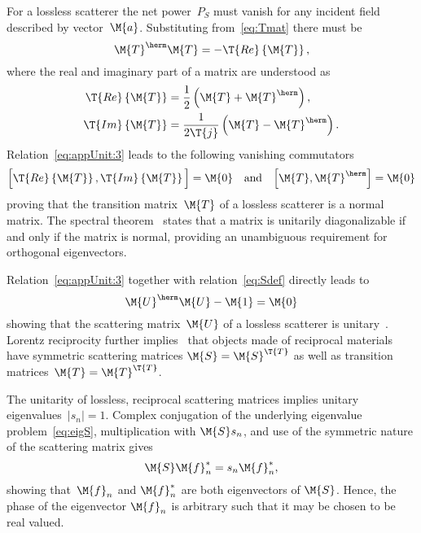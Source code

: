 \documentclass[journal]{IEEEtran}
\providecommand{\Smat}{\M{U}} %
\begin{document}
For a lossless scatterer the net power~$P_S$ must vanish for any incident field described by vector~$\M{a}$. Substituting from~\eqref{eq:Tmat} 
there must be
\begin{equation}
    \label{eq:appUnit:3}
    \M{T}^\herm \M{T} = - \T{Re} \left\{ \M{T} \right\},
\end{equation}
where the real and imaginary part of a matrix are understood as
\begin{equation}
\begin{aligned}
    \T{Re} \left\{ \M{T} \right\} &= \dfrac{1}{2} \left( \M{T} + \M{T}^\herm \right), \\
    \T{Im} \left\{ \M{T} \right\} &= \dfrac{1}{2 \T{j}} \left( \M{T} - \M{T}^\herm \right).
\end{aligned}
\end{equation}
Relation~\eqref{eq:appUnit:3} leads to the following vanishing commutators
\begin{equation}
\Big[\T{Re} \left\{ \M{T} \right\}, \T{Im} \left\{ \M{T} \right\} \Big] = \M{0} \quad \text{and} \quad \Big[ \M{T} , \M{T}^\herm \Big] = \M{0}
\end{equation}
proving that the transition matrix~$\M{T}$ of a lossless scatterer is a normal matrix.  The spectral theorem~\cite[Chap.~2.5]{HornJohnson_MatrixAnalysis} states that a matrix is unitarily diagonalizable if and only if the matrix is normal, providing an unambiguous requirement for orthogonal eigenvectors.

Relation~\eqref{eq:appUnit:3} together with relation~\eqref{eq:Sdef} directly leads to
\begin{equation}
\Smat^\herm \Smat - \M{1} = \M{0}
\end{equation}
showing that the scattering matrix~$\Smat$ of a lossless scatterer is unitary~\cite[Chap.~4]{Collin_FoundationsForMicrowaveEngineering}. Lorentz reciprocity further implies~\cite[Chap.~4]{Collin_FoundationsForMicrowaveEngineering} that objects made of reciprocal materials have symmetric scattering matrices $\M{S}=\M{S}^{\T{T}}$ as well as transition matrices~$\M{T}=\M{T}^{\T{T}}$.

The unitarity of lossless, reciprocal scattering matrices implies unitary eigenvalues~$|s_n|=1$. Complex conjugation of the underlying eigenvalue problem~\eqref{eq:eigS},  multiplication with $\M{S}s_n$, and use of the symmetric nature of the scattering matrix gives     
\begin{equation}
	\M{S}\M{f}^{\ast}_n=s_n\M{f}_n^{\ast},
\end{equation} 
showing that~$\M{f}_n$ and $\M{f}^{\ast}_n$ are both eigenvectors of $\M{S}$. Hence, the phase of the eigenvector $\M{f}_n$ is arbitrary such that it may be chosen to be real valued.  
\end{document}

